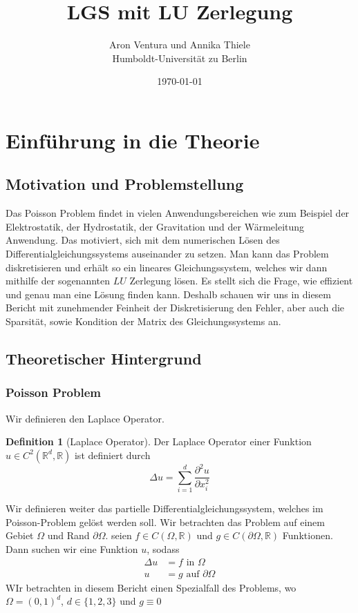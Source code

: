 \documentclass[smallheadings]{scrartcl}
\title{LGS mit LU Zerlegung}
\author{%
 Aron Ventura und Annika Thiele\\ Humboldt-Universit\"at zu Berlin
}
\date{\today}
\theoremstyle{definition}
\newtheorem{definition}{Definition}[section]
\begin{document}
\maketitle
\newpage
\tableofcontents
\newpage


\section{Einf\"uhrung in die Theorie}
	\subsection{Motivation und Problemstellung}
Das Poisson Problem findet in vielen Anwendungsbereichen wie zum Beispiel der Elektrostatik, der Hydrostatik, der Gravitation und der Wärmeleitung Anwendung.
	 	Das motiviert, sich mit dem numerischen Lösen des Differentialgleichungssystems auseinander zu setzen. Man kann das Problem diskretisieren und erhält so ein lineares Gleichungssystem, welches wir dann mithilfe der sogenannten $LU$ Zerlegung lösen. Es stellt sich die Frage, wie effizient und genau man eine Lösung finden kann. Deshalb schauen wir uns in diesem Bericht mit zunehmender Feinheit der Diskretisierung den Fehler, aber auch die Sparsität, sowie Kondition der Matrix des Gleichungssystems an. 


	\subsection{Theoretischer Hintergrund}
		\subsubsection{Poisson Problem}
		Wir definieren den Laplace Operator.
		\begin{definition}[Laplace Operator]
		Der Laplace Operator einer Funktion $u\in C^2(\mathbb{R}^d,\mathbb{R})$ ist definiert durch
		$$\Delta u=\sum_{i=1}^d\frac{\partial ^2 u}{\partial x_i^2}$$

		\end{definition}
		Wir definieren weiter das partielle Differentialgleichungssystem, welches im Poisson-Problem gelöst werden soll. Wir betrachten das Problem auf einem  Gebiet  $\Omega$ und Rand $\partial \Omega$. seien $f\in C(\Omega , \mathbb{R})$ und $g\in C(\partial \Omega , \mathbb{R})$ Funktionen. Dann suchen wir eine Funktion $u$, sodass
		\begin{align*}
		\Delta u&=f \text{ in }\Omega\\
		u&= g \text{ auf }\partial\Omega
		\end{align*}
		WIr betrachten in diesem Bericht einen Spezialfall des Problems, wo $\Omega =(0,1)^d$, $d\in \{1,2,3\}$ und $g\equiv 0$
\end{document}
